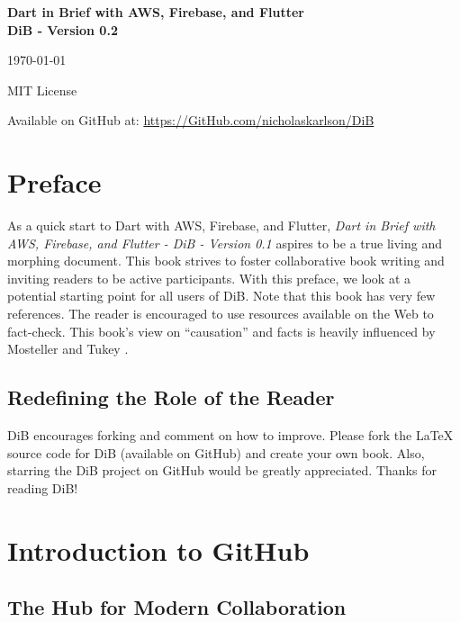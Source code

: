 \documentclass{book}
\begin{document}
\begin{titlepage}
    \centering
    \vspace*{5cm}
    {\Huge\textbf{Dart in Brief with AWS, Firebase, and Flutter\\ DiB - Version 0.2}\par}
    \vspace{2cm}
    {\Large\today\par}
    \vspace{1cm}
    {\large MIT License\par}
    \vspace{1cm}
    {Available on GitHub at: \url{https://GitHub.com/nicholaskarlson/DiB}\par}
\end{titlepage}

\tableofcontents
\cleardoublepage

\chapter*{Preface}
As a quick start to Dart with AWS, Firebase, and Flutter, \emph{Dart in Brief with AWS, Firebase, and Flutter - DiB - Version 0.1} aspires to be a true living and morphing document. This book strives to foster collaborative book writing and inviting readers to be active participants. With this preface, we look at a potential starting point for all users of DiB. Note that this book has very few references. The reader is encouraged to use resources available on the Web to fact-check. This book's view on ``causation'' and facts is heavily influenced by Mosteller and Tukey \cite{mosteller1977}.

\section*{Redefining the Role of the Reader}
DiB encourages forking and comment on how to improve. Please fork the LaTeX source code for DiB (available on GitHub) and create your own book. Also, starring the DiB project on GitHub would be greatly appreciated. Thanks for reading DiB!

\chapter{Introduction to GitHub}
\section*{The Hub for Modern Collaboration}
\end{document}
